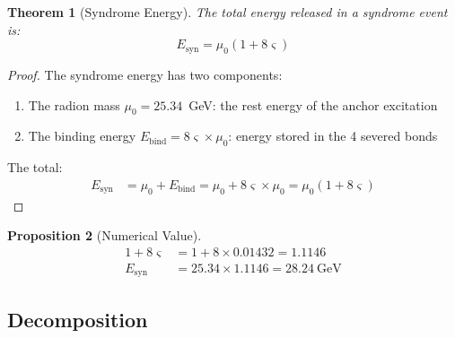 \documentclass[11pt,a4paper]{article}
\newtheorem{theorem}{Theorem}[section]
\newtheorem{proposition}[theorem]{Proposition}
\theoremstyle{definition}
\theoremstyle{remark}
\newcommand{\strain}{\varsigma}
\newcommand{\murad}{\mu_0}
\newcommand{\Esyn}{E_{\mathrm{syn}}}
\begin{document}
\begin{theorem}[Syndrome Energy]
\label{thm:Esyn}
The total energy released in a syndrome event is:
\begin{equation}
\boxed{\Esyn = \murad(1 + 8\strain)}
\end{equation}
\end{theorem}

\begin{proof}
The syndrome energy has two components:
\begin{enumerate}[nosep]
\item The radion mass $\murad = 25.34$~GeV: the rest energy of the anchor excitation
\item The binding energy $E_{\mathrm{bind}} = 8\strain \times \murad$: energy stored in the 4 severed bonds
\end{enumerate}

The total:
\begin{align}
\Esyn &= \murad + E_{\mathrm{bind}} = \murad + 8\strain \times \murad = \murad(1 + 8\strain)
\end{align}
\end{proof}

\begin{proposition}[Numerical Value]
\begin{align}
1 + 8\strain &= 1 + 8 \times 0.01432 = 1.1146 \\
\Esyn &= 25.34 \times 1.1146 = \boxed{28.24~\text{GeV}}
\end{align}
\end{proposition}

\subsection{Decomposition}
\end{document}
